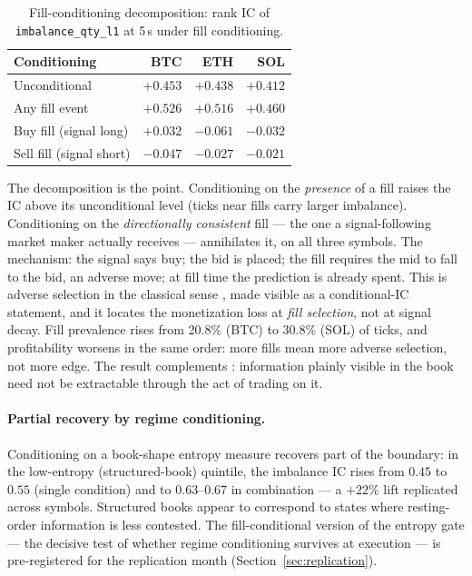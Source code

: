 \documentclass[11pt,a4paper]{article}
\theoremstyle{definition}
\theoremstyle{plain}
\newcommand{\toprule}{\hline\hline}
\newcommand{\midrule}{\hline}
\newcommand{\bottomrule}{\hline\hline}
\newcommand{\feat}[1]{\texttt{#1}}
\begin{document}
\begin{table}[htbp]
\centering
\small
\caption{Fill-conditioning decomposition: rank IC of
\feat{imbalance\_qty\_l1} at 5\,s under fill conditioning.}
\label{tab:conditional}
\begin{tabular}{lrrr}
\toprule
Conditioning & BTC & ETH & SOL \\
\midrule
Unconditional            & $+0.453$ & $+0.438$ & $+0.412$ \\
Any fill event           & $+0.526$ & $+0.516$ & $+0.460$ \\
Buy fill (signal long)   & $+0.032$ & $-0.061$ & $-0.032$ \\
Sell fill (signal short) & $-0.047$ & $-0.027$ & $-0.021$ \\
\bottomrule
\end{tabular}
\end{table}

The decomposition is the point. Conditioning on the \emph{presence} of
a fill raises the IC above its unconditional level (ticks near fills
carry larger imbalance). Conditioning on the \emph{directionally
consistent} fill --- the one a signal-following market maker actually
receives --- annihilates it, on all three symbols. The mechanism: the
signal says buy; the bid is placed; the fill requires the mid to fall
to the bid, an adverse move; at fill time the prediction is already
spent. This is adverse selection in the classical sense
\citep{glosten1985,kyle1985}, made visible as a conditional-IC
statement, and it locates the monetization loss at \emph{fill
selection}, not at signal decay. Fill prevalence rises from 20.8\%
(BTC) to 30.8\% (SOL) of ticks, and profitability worsens in the same
order: more fills mean more adverse selection, not more edge. The
result complements \citet{collindufresne2015}: information plainly
visible in the book need not be extractable through the act of trading
on it.

\paragraph{Partial recovery by regime conditioning.} Conditioning on a
book-shape entropy measure recovers part of the boundary: in the
low-entropy (structured-book) quintile, the imbalance IC rises from
$0.45$ to $0.55$ (single condition) and to $0.63$--$0.67$ in
combination --- a $+22\%$ lift replicated across symbols. Structured
books appear to correspond to states where resting-order information
is less contested. The fill-conditional version of the entropy gate
--- the decisive test of whether regime conditioning survives at
execution --- is pre-registered for the replication month
(Section~\ref{sec:replication}).
\end{document}
